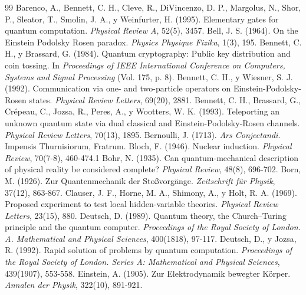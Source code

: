 \documentclass[11pt,a4paper,spanish]{book}
\begin{document}
\begin{thebibliography}{99}
 Barenco, A., Bennett, C. H., Cleve, R., DiVincenzo, D. P., Margolus, N., Shor, P., Sleator, T., Smolin, J. A., y Weinfurter, H. (1995). Elementary gates for quantum computation. \emph{Physical Review A}, 52(5), 3457.
 Bell, J. S. (1964). On the Einstein Podolsky Rosen paradox. \emph{Physics Physique Fizika}, 1(3), 195.
 Bennett, C. H., y Brassard, G. (1984). Quantum cryptography: Public key distribution and coin tossing. In \emph{Proceedings of IEEE International Conference on Computers, Systems and Signal Processing} (Vol. 175, p. 8).
 Bennett, C. H., y Wiesner, S. J. (1992). Communication via one- and two-particle operators on Einstein-Podolsky-Rosen states. \emph{Physical Review Letters}, 69(20), 2881.
 Bennett, C. H., Brassard, G., Crépeau, C., Jozsa, R., Peres, A., y Wootters, W. K. (1993). Teleporting an unknown quantum state via dual classical and Einstein-Podolsky-Rosen channels. \emph{Physical Review Letters}, 70(13), 1895.
 Bernoulli, J. (1713). \emph{Ars Conjectandi}. Impensis Thurnisiorum, Fratrum.
 Bloch, F. (1946). Nuclear induction. \emph{Physical Review}, 70(7-8), 460-474.1
 Bohr, N. (1935). Can quantum-mechanical description of physical reality be considered complete? \emph{Physical Review}, 48(8), 696-702.
 Born, M. (1926). Zur Quantenmechanik der Stoßvorgänge. \emph{Zeitschrift für Physik}, 37(12), 863-867.
 Clauser, J. F., Horne, M. A., Shimony, A., y Holt, R. A. (1969). Proposed experiment to test local hidden-variable theories. \emph{Physical Review Letters}, 23(15), 880.
 Deutsch, D. (1989). Quantum theory, the Church--Turing principle and the quantum computer. \emph{Proceedings of the Royal Society of London. A. Mathematical and Physical Sciences}, 400(1818), 97-117.
 Deutsch, D., y Jozsa, R. (1992). Rapid solution of problems by quantum computation. \emph{Proceedings of the Royal Society of London. Series A: Mathematical and Physical Sciences}, 439(1907), 553-558.
 Einstein, A. (1905). Zur Elektrodynamik bewegter Körper. \emph{Annalen der Physik}, 322(10), 891-921.

\end{thebibliography}
\end{document}
